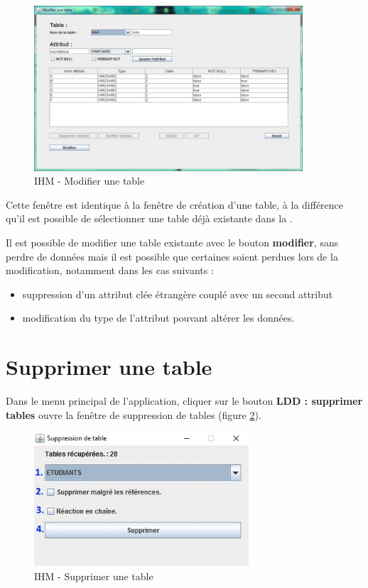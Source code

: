 \begin{figure}[!h]
\centering
\includegraphics[width=10cm]{./images/manuel/modifier_tables.jpg}
\caption{IHM - Modifier une table}
\label{modifier_table_gui}
\end{figure}

Cette fenêtre est identique à la fenêtre de création d'une table, à la différence qu'il est possible de sélectionner une table déjà existante dans la \bdd. 

Il est possible de modifier une table existante avec le bouton \textbf{modifier}, sans perdre de données mais il est possible que certaines soient perdues lors de la modification, notamment dans les cas suivants :
\begin{itemize}
\item suppression d'un attribut clée étrangère couplé avec un second attribut
\item modification du type de l'attribut pouvant altérer les données.
\end{itemize}





\section{Supprimer une table}
Dans le menu principal de l'application, cliquer sur le bouton \textbf{LDD : supprimer tables} ouvre la fen\^etre de suppression de tables (figure \ref{supprimer_table_gui}).

\begin{figure}[!h]
\centering
\includegraphics[width=8cm]{./images/manuel/supprimer_table.jpg}
\caption{IHM - Supprimer une table}
\label{supprimer_table_gui}
\end{figure}

